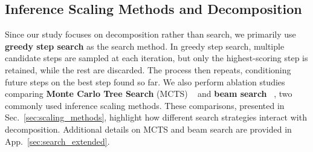 
\vskip -0.1in
\subsection{Inference Scaling Methods and Decomposition}

Since our study focuses on decomposition rather than search, we primarily use \textbf{greedy step search} as the search method. In greedy step search, multiple candidate steps are sampled at each iteration, but only the highest-scoring step is retained, while the rest are discarded. The process then repeats, conditioning future steps on the best step found so far.
We also perform ablation studies comparing \textbf{Monte Carlo Tree Search} (MCTS) ~\citep{feng2023alphazero, light2024scattered} and \textbf{beam search} ~\citep{xie2024self}, two commonly used inference scaling methods. These comparisons, presented in Sec.~\ref{sec:scaling_methods}, highlight how different search strategies interact with decomposition. Additional details on MCTS and beam search are provided in App.~\ref{sec:search_extended}.




